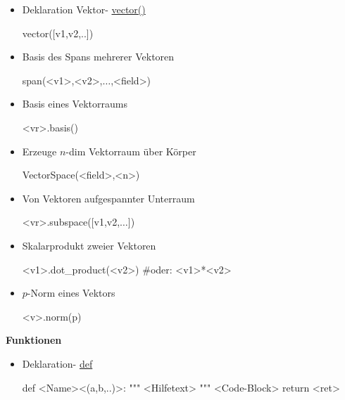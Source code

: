 \documentclass[a4paper,9pt,DIV15,twocolumn]{scrartcl}
\begin{document}
\begin{itemize}
 \item Deklaration Vektor- \href{https://sage.math.uni-goettingen.de/doc/static/reference/sage/modules/free_module_element.html#sage.modules.free_module_element.vector}{vector()}
\begin{sagein}
 vector([v1,v2,..]) 
\end{sagein}

\item Basis des Spans mehrerer Vektoren
	\begin{sagein}
span(<v1>,<v2>,$\ldots$,<field>)
	\end{sagein}

\item Basis eines Vektorraums
	\begin{sagein}
<vr>.basis()
	\end{sagein}

\item Erzeuge $n$-dim Vektorraum \"uber K\"orper
	\begin{sagein}
VectorSpace(<field>,<n>)
	\end{sagein}

\item Von Vektoren aufgespannter Unterraum
	\begin{sagein}
<vr>.subspace([v1,v2,$\ldots$])
	\end{sagein}

\item Skalarprodukt zweier Vektoren
	\begin{sagein}
<v1>.dot_product(<v2>) #oder: <v1>*<v2>
	\end{sagein}

\item $p$-Norm eines Vektors
	\begin{sagein}
<v>.norm(p)
	\end{sagein}

\end{itemize}



\textbf{Funktionen}

\begin{itemize}
 \item Deklaration- \href{http://docs.python.org/reference/compound_stmts.html#function-definitions}{def}
\begin{sagein}
def <Name><(a,b,..)>:
    """ <Hilfetext> """
    <Code-Block>
    return <ret>
\end{sagein}
\end{itemize}
\end{document}
